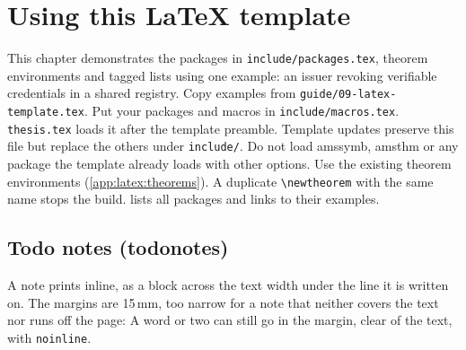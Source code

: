 \chapter{Using this \LaTeX{} template}\label{app:latex}
This chapter demonstrates the packages in \texttt{include/packages.tex}, theorem environments and tagged lists using one example: an issuer revoking verifiable credentials in a shared registry.
Copy examples from \texttt{guide/09-latex-template.tex}.
Put your packages and macros in \texttt{include/macros.tex}. \texttt{thesis.tex} loads it after the template preamble. Template updates preserve this file but replace the others under \texttt{include/}.
Do not load amssymb, amsthm or any package the template already loads with other options. Use the existing theorem environments (\cref{app:latex:theorems}). A duplicate \texttt{\textbackslash newtheorem} with the same name stops the build.
 lists all packages and links to their examples.

\section{Todo notes (todonotes)}\label{app:latex:todo}
A note prints inline, as a block across the text width under the line it is written on. The margins are 15\,mm, too narrow for a note that neither covers the text nor runs off the page:
A word or two can still go in the margin, clear of the text, with \texttt{noinline}.

